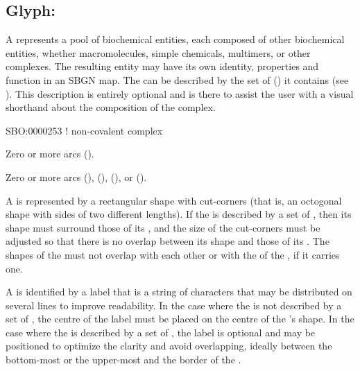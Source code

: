 \subsection{Glyph: }\label{sec:complex}

A  represents a pool of biochemical entities, each composed of other biochemical entities, whether macromolecules, simple chemicals, multimers, or other complexes. The resulting entity may have its own identity, properties and function in an SBGN map.
The  can be described by the set of  () it contains (see ). This description is entirely optional and is there to assist the user with a visual shorthand about the composition of the complex.

\begin{glyphDescription}

\glyphSboTerm
SBO:0000253 ! non-covalent complex

\glyphIncoming
Zero or more  arcs ().

\glyphOutgoing
Zero or more  arcs (),  (),  (), or  ().

\glyphContainer
A  is represented by a rectangular shape with cut-corners (that is, an octogonal shape with sides of two different lengths).
If the  is described by a set of , then its shape must surround those of its , and the size of the cut-corners must be adjusted so that there is no overlap between its shape and those of its .
The shapes of the  must not overlap with each other or with the  of the , if it carries one.

\glyphLabel
A  is identified by a label that is  a string of characters that may be distributed on several lines to improve readability.
In the case where the  is not described by a set of , the centre of the label must be placed on the centre of the 's shape.
In the case where the  is described by a set of , the label is optional and may be positioned to optimize the clarity and avoid overlapping, ideally between the bottom-most or the upper-most  and the border of the .


\end{glyphDescription}
